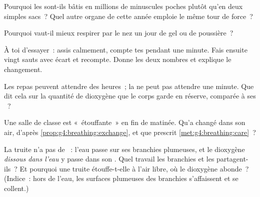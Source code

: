 \begin{exercise}[$\star$]\label{exo:g4:breathing:6}
Pourquoi les  sont-ils bâtis en millions de minuscules poches
plutôt qu'en deux simples sacs~? Quel autre organe de cette année
emploie le même tour de force~?
\end{exercise}

\begin{exercise}[$\star$]\label{exo:g4:breathing:7}
Pourquoi vaut-il mieux respirer par le nez un jour de gel ou de
poussière~?
\end{exercise}

\begin{exercise}[$\star$]\label{exo:g4:breathing:8}
À toi d'essayer~: assis calmement, compte tes  pendant
une minute. Fais ensuite vingt sauts avec écart et recompte. Donne
les deux nombres et explique le changement.
\end{exercise}

\begin{exercise}[$\star\star$]\label{exo:g4:breathing:9}
Les repas peuvent attendre des heures~; la  ne peut pas
attendre une minute. Que dit cela sur la quantité de dioxygène que
le corps garde en réserve, comparée à ses ~?
\end{exercise}

\begin{exercise}[$\star\star$]\label{exo:g4:breathing:10}
Une salle de classe est «~étouffante~» en fin de matinée. Qu'a
changé dans son air, d'après \cref{prop:g4:breathing:exchange}, et
que prescrit \cref{met:g4:breathing:care}~?
\end{exercise}

\begin{exercise}[$\star\star\star$]\label{exo:g4:breathing:11}
La truite n'a pas de ~: l'eau passe sur ses branchies
plumeuses, et le dioxygène \emph{dissous dans l'eau} y passe dans
son . Quel travail les branchies et les  partagent-ils~?
Et pourquoi une truite étouffe-t-elle à l'air libre, où le dioxygène
abonde~? (Indice~: hors de l'eau, les surfaces plumeuses des
branchies s'affaissent et se collent.)
\end{exercise}
